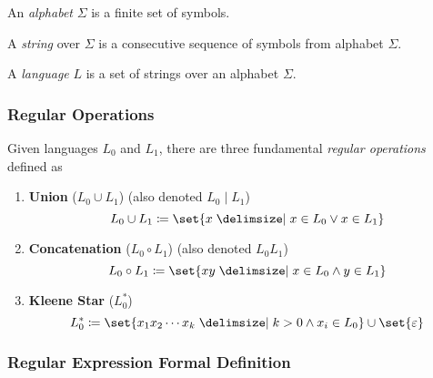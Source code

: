 \begin{definition}[Alphabet]
    An \textit{alphabet} $\Sigma$ is a finite set of symbols.
\end{definition}

\begin{definition}[String]
    A \textit{string} over $\Sigma$ is a consecutive sequence of symbols from alphabet $\Sigma$.
\end{definition}

\begin{definition}[Language]
    A \textit{language} $L$ is a set of strings over an alphabet $\Sigma$.
\end{definition}

\subsubsection{Regular Operations}

\begin{definition}
    Given languages $L_0$ and $L_1$, there are three fundamental \textit{regular operations} defined as
    \begin{enumerate}
        \item \textbf{Union} ($L_0 \cup L_1$) (also denoted $L_0 \mid L_1$)
            \begin{equation}
                L_0 \cup L_1 \coloneqq 
                    \set{ x \given x \in L_0 \lor x \in L_1 }
            \end{equation}
        \item \textbf{Concatenation} ($L_0 \circ L_1$) (also denoted $L_0 L_1$)
            \begin{equation}
                L_0 \circ L_1 \coloneqq
                    \set{ xy \given x \in L_0 \land y \in L_1 }
            \end{equation}
        \item \textbf{Kleene Star} ($L_0^{\ast}$)
            \begin{equation}
                L_0^{\ast} \coloneqq
                    \set{ x_1 x_2 \cdots x_k 
                        \given k > 0 \land x_i \in L_0
                    } \cup \set{ \varepsilon }
            \end{equation}
    \end{enumerate}
\end{definition}

\subsubsection{Regular Expression Formal Definition}

